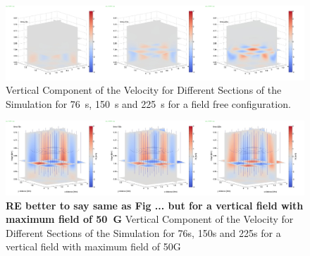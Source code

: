 \documentclass{aastex62}
\begin{document}
\begin{figure}[h]\label{vzplot_bv0g_76_150_225}
\includegraphics[scale=0.15]{imrescale/vz_bv0g_76_150_225.jpg}
\caption{Vertical Component of the Velocity for Different Sections of the Simulation for 76~s, 150~s and 225~s for a field free configuration.}
\end{figure}

\begin{figure}[h]\label{vzplot_bv50g_76_150_225}
\includegraphics[scale=0.15]{imrescale/vz_bv50g_76_150_225.jpg}
\caption{{\bf RE better to say same as Fig ... but for a vertical field with maximum field of 50~G} Vertical Component of the Velocity for Different Sections of the Simulation for 76s, 150s and 225s for a vertical field with maximum field of 50G}
\end{figure}



\end{document}
